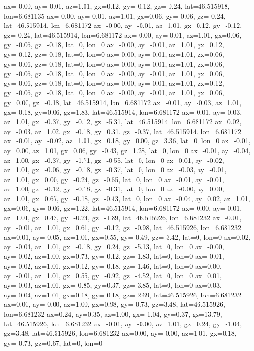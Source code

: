ax=-0.00, ay=-0.01, az=1.01, gx=0.12, gy=-0.12, gz=-0.24, lat=46.515918, lon=6.681135
ax=-0.00, ay=-0.01, az=1.01, gx=0.06, gy=-0.06, gz=-0.24, lat=46.515914, lon=6.681172
ax=-0.00, ay=-0.01, az=1.01, gx=0.12, gy=-0.12, gz=-0.24, lat=46.515914, lon=6.681172
ax=-0.00, ay=-0.01, az=1.01, gx=0.06, gy=-0.06, gz=-0.18, lat=0, lon=0
ax=-0.00, ay=-0.01, az=1.01, gx=0.12, gy=-0.12, gz=-0.18, lat=0, lon=0
ax=-0.00, ay=-0.01, az=1.01, gx=0.06, gy=-0.06, gz=-0.18, lat=0, lon=0
ax=-0.00, ay=-0.01, az=1.01, gx=0.06, gy=-0.06, gz=-0.18, lat=0, lon=0
ax=-0.00, ay=-0.01, az=1.01, gx=0.06, gy=-0.06, gz=-0.18, lat=0, lon=0
ax=-0.00, ay=-0.01, az=1.01, gx=0.12, gy=-0.06, gz=-0.18, lat=0, lon=0
ax=-0.00, ay=-0.01, az=1.01, gx=0.06, gy=0.00, gz=-0.18, lat=46.515914, lon=6.681172
ax=-0.01, ay=-0.03, az=1.01, gx=-0.18, gy=0.06, gz=1.83, lat=46.515914, lon=6.681172
ax=-0.01, ay=-0.03, az=1.01, gx=-0.37, gy=-0.12, gz=-5.31, lat=46.515914, lon=6.681172
ax=0.02, ay=-0.03, az=1.02, gx=-0.18, gy=0.31, gz=-0.37, lat=46.515914, lon=6.681172
ax=-0.01, ay=-0.02, az=1.01, gx=0.18, gy=0.00, gz=3.36, lat=0, lon=0
ax=-0.01, ay=0.00, az=1.01, gx=0.06, gy=-0.43, gz=1.28, lat=0, lon=0
ax=-0.01, ay=-0.04, az=1.00, gx=-0.37, gy=-1.71, gz=-0.55, lat=0, lon=0
ax=0.01, ay=-0.02, az=1.01, gx=-0.06, gy=-0.18, gz=-0.37, lat=0, lon=0
ax=-0.03, ay=-0.01, az=1.01, gx=0.00, gy=-0.24, gz=-0.55, lat=0, lon=0
ax=-0.01, ay=-0.01, az=1.00, gx=-0.12, gy=-0.18, gz=-0.31, lat=0, lon=0
ax=-0.00, ay=0.00, az=1.01, gx=0.67, gy=-0.18, gz=-0.43, lat=0, lon=0
ax=-0.04, ay=0.02, az=1.01, gx=0.06, gy=-0.06, gz=1.22, lat=46.515914, lon=6.681172
ax=-0.00, ay=-0.01, az=1.01, gx=0.43, gy=-0.24, gz=-1.89, lat=46.515926, lon=6.681232
ax=-0.01, ay=-0.01, az=1.01, gx=0.61, gy=-0.12, gz=-0.98, lat=46.515926, lon=6.681232
ax=0.01, ay=-0.05, az=1.01, gx=0.55, gy=-0.49, gz=-3.42, lat=0, lon=0
ax=0.02, ay=-0.04, az=1.01, gx=-0.18, gy=0.24, gz=-5.13, lat=0, lon=0
ax=-0.00, ay=-0.02, az=1.00, gx=0.73, gy=-0.12, gz=-1.83, lat=0, lon=0
ax=-0.01, ay=-0.02, az=1.01, gx=0.12, gy=-0.18, gz=-1.46, lat=0, lon=0
ax=0.00, ay=-0.01, az=1.01, gx=0.55, gy=-0.92, gz=-4.52, lat=0, lon=0
ax=0.01, ay=-0.03, az=1.01, gx=-0.85, gy=0.37, gz=-3.85, lat=0, lon=0
ax=0.03, ay=-0.04, az=1.01, gx=0.18, gy=-0.18, gz=-2.69, lat=46.515926, lon=6.681232
ax=0.00, ay=-0.00, az=1.00, gx=0.98, gy=-0.73, gz=3.48, lat=46.515926, lon=6.681232
ax=0.24, ay=0.35, az=1.00, gx=-1.04, gy=0.37, gz=13.79, lat=46.515926, lon=6.681232
ax=-0.01, ay=-0.00, az=1.01, gx=0.24, gy=-1.04, gz=3.48, lat=46.515926, lon=6.681232
ax=0.00, ay=-0.00, az=1.01, gx=0.18, gy=-0.73, gz=0.67, lat=0, lon=0

